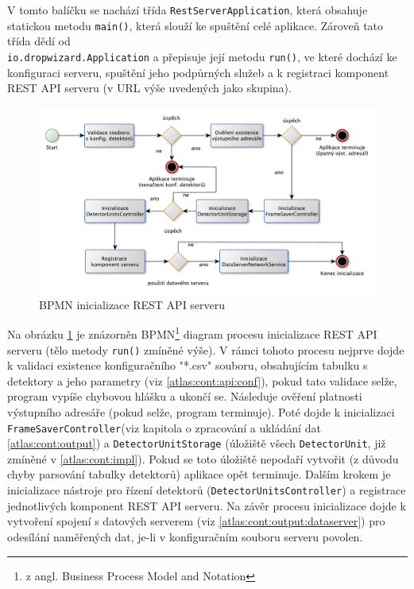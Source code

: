V tomto balíčku se nachází třída \texttt{RestServerApplication}, která obsahuje statickou metodu \texttt{main()}, která slouží ke spuštění celé aplikace. Zároveň tato třída dědí od \\\texttt{io.dropwizard.Application} a přepisuje její metodu \texttt{run()}, ve které dochází ke konfiguraci serveru, spuštění jeho podpůrných služeb a k registraci komponent REST API serveru (v URL výše uvedených jako skupina).

\begin{figure}[th]
	\begin{center}
		\includegraphics[width=15cm]{figures/atlas_tpx_api_server_init.pdf}
		\caption{BPMN inicializace REST API serveru}
		\label{fig:atlas:apiserver-init}
	\end{center}
\end{figure}

Na obrázku \ref{fig:atlas:apiserver-init} je znázorněn BPMN\footnote{z angl. Business Process Model and Notation} diagram procesu inicializace REST API serveru (tělo metody \texttt{run()} zmíněné výše). V rámci tohoto procesu nejprve dojde k validaci existence konfiguračního "*.csv" souboru, obsahujícím tabulku s detektory a jeho parametry (viz \ref{atlas:cont:api:conf}), pokud tato validace selže, program vypíše chybovou hlášku a ukončí se.  Následuje ověření platnosti výstupního adresáře (pokud selže, program terminuje). Poté dojde k inicializaci \texttt{FrameSaverController}(viz kapitola o zpracování a ukládání dat \ref{atlas:cont:output}) a \texttt{DetectorUnitStorage} (úložiště všech \texttt{DetectorUnit}, již zmíněné v \ref{atlas:cont:impl}). Pokud se toto úložiště nepodaří vytvořit (z důvodu chyby parsování tabulky detektorů) aplikace opět terminuje. Dalším krokem je inicializace nástroje pro řízení detektorů (\texttt{DetectorUnitsController}) a registrace jednotlivých komponent REST API serveru. Na závěr procesu inicializace dojde k vytvoření spojení s datových serverem (viz \ref{atlas:cont:output:dataserver}) pro odesílání naměřených dat, je-li v konfiguračním souboru serveru povolen. 

